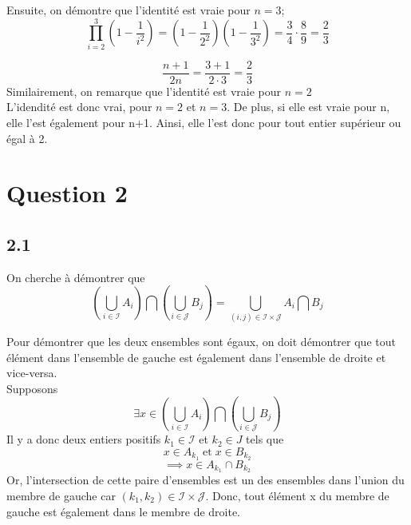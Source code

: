 \documentclass[letterpaper,12pt,oneside,final]{book}
\begin{document}
Ensuite, on démontre que l'identité est vraie pour $n=3$;
\begin{equation*}
    \prod _{i=2}^{3} \left ( 1 - \frac{1}{i^2} \right ) = \left(1-\frac{1}{2^2}\right)
    \left(1-\frac{1}{3^2}\right) = \frac{3}{4} \cdot \frac{8}{9} = \frac{2}{3}
\end{equation*}

\begin{equation*}
    \frac{n+1}{2n} = \frac{3+1}{2\cdot 3} = \frac{2}{3}
\end{equation*}
Similairement, on remarque que l'identité est vraie pour $n=2$\\

L'idendité est donc vrai, pour $n=2$ et $n=3$. De plus, si elle est vraie pour n, elle l'est également pour n+1. Ainsi, elle l'est donc pour tout entier supérieur ou égal à 2.
\newpage
\section*{Question 2}

\subsection*{2.1}

On cherche à démontrer que 
\begin{equation*}
    \left(\bigcup_{i\in \mathcal{I}}A_i\right) \bigcap \left(\bigcup_{i\in \mathcal{J}}B_j\right)
    = \bigcup_{(i,j)\in \mathcal{I}\times\mathcal{J}}A_i \bigcap B_j
\end{equation*}

Pour démontrer que les deux ensembles sont égaux, on doit démontrer que tout élément dans l'ensemble de gauche
est également dans l'ensemble de droite et vice-versa. \\
Supposons
\begin{equation*}
    \exists x \in\left(\bigcup_{i\in \mathcal{I}}A_i\right) \bigcap \left(\bigcup_{i\in \mathcal{J}}B_j\right)
\end{equation*}
Il y a donc deux entiers positifs $k_1\in \mathcal{I}$ et $k_2\in J$ tels que
\begin{equation*}
    x \in A_{k_1}\; \text{et}\; x\in B_{k_2}
\end{equation*}
\begin{equation*}
    \implies x\in A_{k_1} \cap B_{k_2}
\end{equation*}
Or, l'intersection de cette paire d'ensembles est un des ensembles dans l'union du membre de gauche car 
$(k_1, k_2) \in \mathcal{I} \times \mathcal{J}$. Donc, tout élément x du membre de gauche est également dans le membre de droite.
\end{document}

